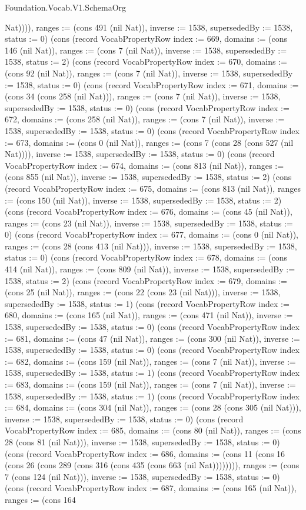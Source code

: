 \begin{lexlean}{Foundation.Vocab.V1.SchemaOrg}
\begin{semanticmodule}
{Nat)))), ranges := (cons 491 (nil Nat)), inverse := 1538, supersededBy := 1538, status := 0}) (cons (record VocabPropertyRow {index := 669, domains := (cons 146 (nil Nat)), ranges := (cons 7 (nil Nat)), inverse := 1538, supersededBy := 1538, status := 2}) (cons (record VocabPropertyRow {index := 670, domains := (cons 92 (nil Nat)), ranges := (cons 7 (nil Nat)), inverse := 1538, supersededBy := 1538, status := 0}) (cons (record VocabPropertyRow {index := 671, domains := (cons 34 (cons 258 (nil Nat))), ranges := (cons 7 (nil Nat)), inverse := 1538, supersededBy := 1538, status := 0}) (cons (record VocabPropertyRow {index := 672, domains := (cons 258 (nil Nat)), ranges := (cons 7 (nil Nat)), inverse := 1538, supersededBy := 1538, status := 0}) (cons (record VocabPropertyRow {index := 673, domains := (cons 0 (nil Nat)), ranges := (cons 7 (cons 28 (cons 527 (nil Nat)))), inverse := 1538, supersededBy := 1538, status := 0}) (cons (record VocabPropertyRow {index := 674, domains := (cons 813 (nil Nat)), ranges := (cons 855 (nil Nat)), inverse := 1538, supersededBy := 1538, status := 2}) (cons (record VocabPropertyRow {index := 675, domains := (cons 813 (nil Nat)), ranges := (cons 150 (nil Nat)), inverse := 1538, supersededBy := 1538, status := 2}) (cons (record VocabPropertyRow {index := 676, domains := (cons 45 (nil Nat)), ranges := (cons 23 (nil Nat)), inverse := 1538, supersededBy := 1538, status := 0}) (cons (record VocabPropertyRow {index := 677, domains := (cons 0 (nil Nat)), ranges := (cons 28 (cons 413 (nil Nat))), inverse := 1538, supersededBy := 1538, status := 0}) (cons (record VocabPropertyRow {index := 678, domains := (cons 414 (nil Nat)), ranges := (cons 809 (nil Nat)), inverse := 1538, supersededBy := 1538, status := 2}) (cons (record VocabPropertyRow {index := 679, domains := (cons 25 (nil Nat)), ranges := (cons 22 (cons 23 (nil Nat))), inverse := 1538, supersededBy := 1538, status := 1}) (cons (record VocabPropertyRow {index := 680, domains := (cons 165 (nil Nat)), ranges := (cons 471 (nil Nat)), inverse := 1538, supersededBy := 1538, status := 0}) (cons (record VocabPropertyRow {index := 681, domains := (cons 47 (nil Nat)), ranges := (cons 300 (nil Nat)), inverse := 1538, supersededBy := 1538, status := 0}) (cons (record VocabPropertyRow {index := 682, domains := (cons 159 (nil Nat)), ranges := (cons 7 (nil Nat)), inverse := 1538, supersededBy := 1538, status := 1}) (cons (record VocabPropertyRow {index := 683, domains := (cons 159 (nil Nat)), ranges := (cons 7 (nil Nat)), inverse := 1538, supersededBy := 1538, status := 1}) (cons (record VocabPropertyRow {index := 684, domains := (cons 304 (nil Nat)), ranges := (cons 28 (cons 305 (nil Nat))), inverse := 1538, supersededBy := 1538, status := 0}) (cons (record VocabPropertyRow {index := 685, domains := (cons 80 (nil Nat)), ranges := (cons 28 (cons 81 (nil Nat))), inverse := 1538, supersededBy := 1538, status := 0}) (cons (record VocabPropertyRow {index := 686, domains := (cons 11 (cons 16 (cons 26 (cons 289 (cons 316 (cons 435 (cons 663 (nil Nat)))))))), ranges := (cons 7 (cons 124 (nil Nat))), inverse := 1538, supersededBy := 1538, status := 0}) (cons (record VocabPropertyRow {index := 687, domains := (cons 165 (nil Nat)), ranges := (cons 164 }
\end{semanticmodule}
\end{lexlean}
